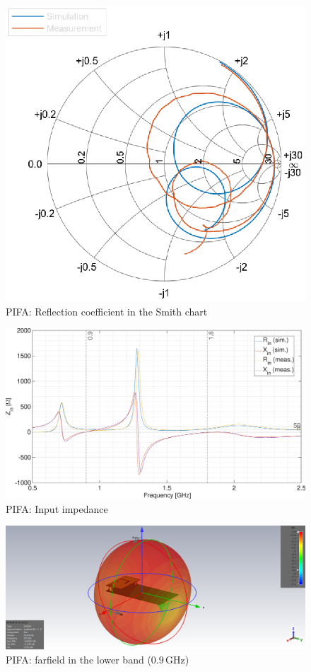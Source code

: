 \documentclass[11pt,a4paper]{article}
\begin{document}
        \begin{figure}[!ht]
            \centering
            \includegraphics[width=.7\textwidth]{src/pifa-reflection-smith.eps}
            \caption{\label{fig:pifa-reflection-smith}PIFA: Reflection coefficient in the Smith chart}
        \end{figure}
        
\newpage
        \begin{figure}[!ht]
            \centering
            \includegraphics[width=.8\textwidth]{src/pifa-impedance.eps}
            \caption{\label{fig:pifa-impedance}PIFA: Input impedance}
        \end{figure}

        \begin{figure}[!ht]
            \centering
            \includegraphics[width=.8\textwidth]{src/pifa-farfield-0G9Hz.png}
            \caption{\label{fig:pifa-farfield-0G9Hz}PIFA: farfield in the lower band ($0.9\, \mathrm{GHz}$)}
        \end{figure}
\end{document}
